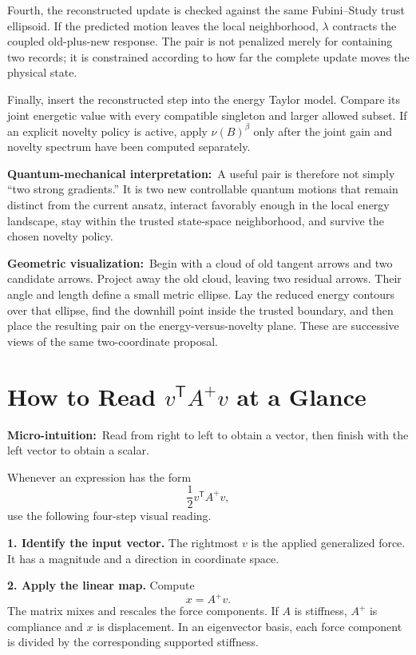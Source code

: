 \documentclass[10pt,twocolumn]{article}
\newcommand{\micro}[1]{\par\noindent\textbf{Micro-intuition:}\ #1\par}
\newcommand{\phys}[1]{\par\noindent\textbf{Quantum-mechanical interpretation:}\ #1\par}
\newcommand{\geom}[1]{\par\noindent\textbf{Geometric visualization:}\ \textcolor{teal!70!black}{#1}\par}
\begin{document}
Fourth, the reconstructed update is checked against the same Fubini--Study
trust ellipsoid. If the predicted motion leaves the local neighborhood,
\(\lambda\) contracts the coupled old-plus-new response. The pair is not
penalized merely for containing two records; it is constrained according to
how far the complete update moves the physical state.

Finally, insert the reconstructed step into the energy Taylor model. Compare
its joint energetic value with every compatible singleton and larger allowed
subset. If an explicit novelty policy is active, apply
\(\nu(B)^\beta\) only after the joint gain and novelty spectrum have
been computed separately.

\phys{A useful pair is therefore not simply ``two strong gradients.'' It is two
new controllable quantum motions that remain distinct from the current ansatz,
interact favorably enough in the local energy landscape, stay within the
trusted state-space neighborhood, and survive the chosen novelty policy.}

\geom{Begin with a cloud of old tangent arrows and two candidate arrows.
Project away the old cloud, leaving two residual arrows. Their angle and length
define a small metric ellipse. Lay the reduced energy contours over that
ellipse, find the downhill point inside the trusted boundary, and then place
the resulting pair on the energy-versus-novelty plane. These are successive
views of the same two-coordinate proposal.}

\section*{How to Read \(v^{\mathsf T}A^{+}v\) at a Glance}

\micro{Read from right to left to obtain a vector, then finish with the left
vector to obtain a scalar.}

Whenever an expression has the form
\[
\frac12v^{\mathsf T}A^+v,
\]
use the following four-step visual reading.

\textbf{1. Identify the input vector.}
The rightmost \(v\) is the applied generalized force. It has a magnitude and a
direction in coordinate space.

\textbf{2. Apply the linear map.}
Compute
\[
x=A^+v.
\]
The matrix mixes and rescales the force components. If \(A\) is stiffness,
\(A^+\) is compliance and \(x\) is displacement. In an eigenvector basis, each
force component is divided by the corresponding supported stiffness.
\end{document}
